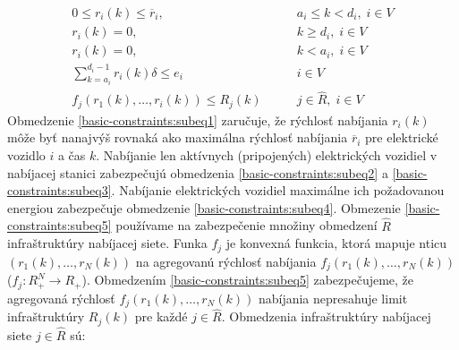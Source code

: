 







\begin{subequations}
\begin{align}
    0 \leq r_{i}(k) \leq \overline{r}_{i}, & \qquad a_{i} \leq k < d_{i}, \; i  \in V \label{basic-constraints:subeq1}  \\
    r_{i}(k) = 0,  & \qquad   k \geq d_{i},\;  i \in V  \label{basic-constraints:subeq2} \\
    r_{i}(k) = 0, & \qquad k < a_{i},  \; i \in V \label{basic-constraints:subeq3} \\
    \sum_{k = a_{i}}^{d_{i} - 1} r_{i}(k) \delta \leq e_{i} & \qquad i \in V \label{basic-constraints:subeq4}\\
    f_{j}(r_{1}(k), \dots, r_{i}(k)) \leq R_{j}(k) &   \qquad j \in \hat{R} , \; i \in V \label{basic-constraints:subeq5}
\end{align}
\end{subequations}
Obmedzenie \eqref{basic-constraints:subeq1} zaručuje, že rýchlosť nabíjania $r_{i}(k)$ môže byť nanajvýš rovnaká ako maximálna rýchlosť nabíjania $\overline{r}_{i}$ pre elektrické vozidlo $i$ a čas $k$. Nabíjanie len aktívnych (pripojených) elektrických vozidiel v nabíjacej stanici zabezpečujú obmedzenia \eqref{basic-constraints:subeq2} a \eqref{basic-constraints:subeq3}. Nabíjanie elektrických vozidiel maximálne ich požadovanou energiou zabezpečuje obmedzenie \eqref{basic-constraints:subeq4}.  Obmezenie \eqref{basic-constraints:subeq5} používame na zabezpečenie množiny obmedzení $\hat{R}$ infraštruktúry nabíjacej siete. Funka $f_{j}$ je konvexná funkcia, ktorá mapuje nticu $(r_{1}(k), \dots, r_{N}(k))$ na agregovanú rýchlosť nabíjania $f_{j}(r_{1}(k), \dots, r_{N}(k))$ ($f_{j}: R_{+}^{N} \rightarrow R_{+}$). Obmedzením \eqref{basic-constraints:subeq5} zabezpečujeme, že agregovaná rýchlosť $f_{j}(r_{1}(k), \dots, r_{N}(k))$ nabíjania nepresahuje limit infraštruktúry $R_{j}(k)$ pre každé $j \in \hat{R} $. Obmedzenia infraštruktúry nabíjacej siete $j \in \hat{R}$ sú:






